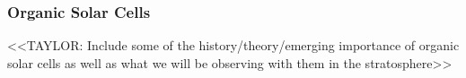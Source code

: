 \subsubsection{Organic Solar Cells}
<<TAYLOR: Include some of the history/theory/emerging importance of organic solar cells as well as what we will be observing with them in the stratosphere>>







